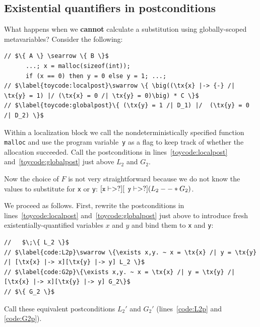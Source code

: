 \documentclass[acmsmall,screen]{acmart}  %
\newcommand{\li}[1]{{\texttt{\small #1}}} %
\newcommand\hide[1]{}
\newcommand{\tx}[1]{\text{#1}}
\begin{document}
{\subsection{Existential quantifiers in postconditions}
\label{sec:existentials}

What happens when we \textbf{cannot} calculate a substitution using globally-scoped metavariables?  Consider the following: \begin{lstlisting}
// $\{ A \} \searrow \{ B \}$
      ...; x = malloc(sizeof(int));
      if (x == 0) then y = 0 else y = 1; ...;
// $\label{toycode:localpost}\swarrow \{ \big((\tx{x} |-> {-} /| \tx{y} = 1) |/ (\tx{x} = 0 /| \tx{y} = 0)\big) * C \}$
// $\label{toycode:globalpost}\{ (\tx{y} = 1 /| D_1) |/  (\tx{y} = 0 /| D_2) \}$
\end{lstlisting}
\vspace*{-1.5ex}
Within a localization block we call the nondeterministically specified function \li{malloc} and use the program variable~\li{y} as a flag to keep track of whether the allocation succeeded.  Call the postconditions in lines~\ref{toycode:localpost} and~\ref{toycode:globalpost} just above $L_2$ and $G_2$. 

Now the choice of $F$ is not very straightforward because we do not know the values to substitute for \li{x} or \li{y}: $[\li{x} |-> ?][\li{y} |-> ?] (L_2 --* G_2)$. \label{eqn:unclearsubst}

\hide{
\vspace*{-1.5ex}
\begin{equation}
\label{eqn:unclearsubst}
[\li{x} |-> ?][\li{y} |-> ?] (L_2 --* G_2)
\vspace*{-1.5ex}
\end{equation}
} 

We proceed as follows.  First, rewrite the postconditions in lines~\ref{toycode:localpost} and~\ref{toycode:globalpost} just above to introduce fresh existentially-quantified  variables $x$ and $y$ and bind them to \li{x} and \li{y}:
\begin{lstlisting}[firstnumber=4]
//   $\;\{ L_2 \}$
// $\label{code:L2p}\swarrow \{\exists x,y. ~ x = \tx{x} /| y = \tx{y} /| [\tx{x} |-> x][\tx{y} |-> y] L_2 \}$
// $\label{code:G2p}\{\exists x,y. ~ x = \tx{x} /| y = \tx{y} /| [\tx{x} |-> x][\tx{y} |-> y] G_2\}$
// $\{ G_2 \}$
\end{lstlisting}
Call these equivalent postconditions $L_2'$ and $G_2'$ (lines~\ref{code:L2p} and
\ref{code:G2p}).




}
\end{document}

